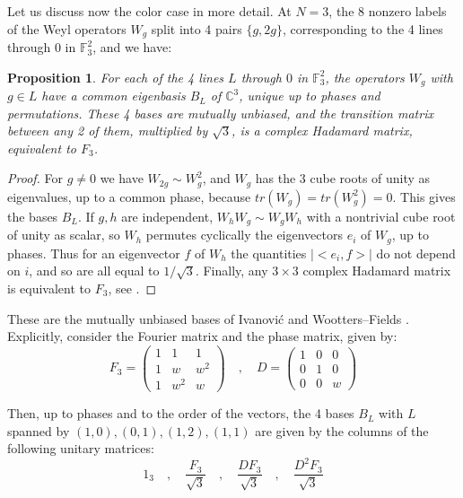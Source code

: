 \documentclass[11pt]{amsart}
\newtheorem{proposition}[theorem]{Proposition}
\theoremstyle{definition}
\begin{document}
Let us discuss now the color case in more detail. At $N=3$, the 8 nonzero labels of the Weyl operators $W_g$ split into 4 pairs $\{g,2g\}$, corresponding to the 4 lines through $0$ in $\mathbb F_3^2$, and we have:

\begin{proposition}
For each of the 4 lines $L$ through $0$ in $\mathbb F_3^2$, the operators $W_g$ with $g\in L$ have a common eigenbasis $B_L$ of $\mathbb C^3$, unique up to phases and permutations. These 4 bases are mutually unbiased, and the transition matrix between any 2 of them, multiplied by $\sqrt{3}$, is a complex Hadamard matrix, equivalent to $F_3$.
\end{proposition}

\begin{proof}
For $g\neq0$ we have $W_{2g}\sim W_g^2$, and $W_g$ has the 3 cube roots of unity as eigenvalues, up to a common phase, because $tr(W_g)=tr(W_g^2)=0$. This gives the bases $B_L$. If $g,h$ are independent, $W_hW_g\sim W_gW_h$ with a nontrivial cube root of unity as scalar, so $W_h$ permutes cyclically the eigenvectors $e_i$ of $W_g$, up to phases. Thus for an eigenvector $f$ of $W_h$ the quantities $|<e_i,f>|$ do not depend on $i$, and so are all equal to $1/\sqrt{3}$. Finally, any $3\times3$ complex Hadamard matrix is equivalent to $F_3$, see \cite{haa,tzy}.
\end{proof}

These are the mutually unbiased bases of Ivanovi\'c and Wootters--Fields \cite{ivi,wfi}. Explicitly, consider the Fourier matrix and the phase matrix, given by:
$$F_3=\begin{pmatrix}1&1&1\\ 1&w&w^2\\ 1&w^2&w\end{pmatrix}\quad,\quad D=\begin{pmatrix}1&0&0\\ 0&1&0\\ 0&0&w\end{pmatrix}$$

Then, up to phases and to the order of the vectors, the 4 bases $B_L$ with $L$ spanned by $(1,0),(0,1),(1,2),(1,1)$ are given by the columns of the following unitary matrices:
$$1_3\quad,\quad\frac{F_3}{\sqrt{3}}\quad,\quad\frac{DF_3}{\sqrt{3}}\quad,\quad\frac{D^2F_3}{\sqrt{3}}$$
\end{document}
